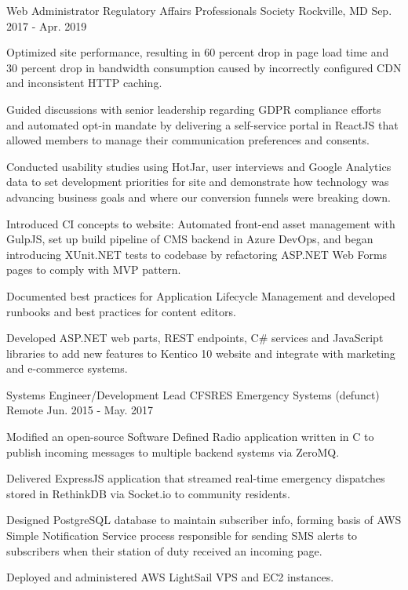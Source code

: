 \begin{cventries}
  \cventry
    {Web Administrator} %
    {Regulatory Affairs Professionals Society} %
    {Rockville, MD} %
    {Sep. 2017 - Apr. 2019} %
    {
      \begin{cvitems} %
		\item {Optimized site performance, resulting in 60 percent drop in page load time and 30 percent drop in bandwidth consumption caused by incorrectly configured CDN and inconsistent HTTP caching.}
		\item {Guided discussions with senior leadership regarding GDPR compliance efforts and automated opt-in mandate by delivering a self-service portal in ReactJS that allowed members to manage their communication preferences and consents.}
		\item {Conducted usability studies using HotJar, user interviews and Google Analytics data to set development priorities for site and demonstrate how technology was advancing business goals and where our conversion funnels were breaking down.}
        \item {Introduced CI concepts to website: Automated front-end asset management with GulpJS, set up build pipeline of CMS backend in Azure DevOps, and began introducing XUnit.NET tests to codebase by refactoring ASP.NET Web Forms pages to comply with MVP pattern.}
        \item {Documented best practices for Application Lifecycle Management and developed runbooks and best practices for content editors.}
        \item {Developed ASP.NET web parts, REST endpoints, C\# services and JavaScript libraries to add new features to Kentico 10 website and integrate with marketing and e-commerce systems.}
      \end{cvitems}
    }

\cventry
{Systems Engineer/Development Lead} %
{CFSRES Emergency Systems (defunct)} %
{Remote} %
{Jun. 2015 - May. 2017} %
{
    \begin{cvitems} %
        \item {Modified an open-source Software Defined Radio application written in C to publish incoming messages to multiple backend systems via ZeroMQ.}
        \item {Delivered ExpressJS application that streamed real-time emergency dispatches stored in RethinkDB via Socket.io to community residents.}
        \item {Designed PostgreSQL database to maintain subscriber info, forming basis of AWS Simple Notification Service process responsible for sending SMS alerts to subscribers when their station of duty received an incoming page.}
        \item {Deployed and administered AWS LightSail VPS and EC2 instances.}
    \end{cvitems}
}


\end{cventries}
